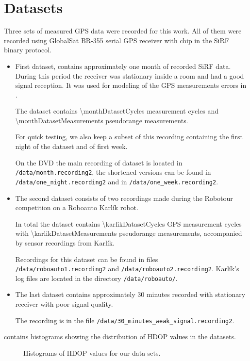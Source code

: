 \chapter{Datasets}
\label{chap:datasets}

Three sets of measured GPS data were recorded for this work.
All of them were recorded using GlobalSat BR-355 serial GPS receiver with \sirf chip
in the SiRF binary protocol.

\begin{itemize}

\item
First dataset,  contains approximately one month of recorded SiRF data.
During this period the receiver was stationary inside a room and had a good signal 
reception.
It was used for modeling of the GPS measurements errors in .

The dataset contains \num{\monthDatasetCycles} measurement cycles and
\num{\monthDatasetMeasurements} pseudorange measurements.

For quick testing, we also keep a subset of this recording containing the
first night of the dataset and of first week.

On the DVD the main recording of dataset is located in \verb=/data/month.recording2=,
the shortened versions can be found in \verb=/data/one_night.recording2= and in
\verb=/data/one_week.recording2=.

\item
The second dataset consists of two recordings made during
the Robotour competition \cite{robotour} on a Roboauto Karlík \cite{karlik} robot.

In total the dataset contains \num{\karlikDatasetCycles} GPS measurement cycles with
\num{\karlikDatasetMeasurements} pseudorange measurements, accompanied by sensor recordings from Karlík.

Recordings for this dataset can be found in files \verb=/data/roboauto1.recording2=
and \verb=/data/roboauto2.recording2=.
Karlík's log files are located in the directory \verb=/data/roboauto/=.

\item
The last dataset contains approximately
30 minutes recorded with stationary receiver with poor signal quality.

The recording is in the file \verb=/data/30_minutes_weak_signal.recording2=.

\end{itemize}

 contains histograms showing the distribution of HDOP values in the datasets.

\begin{figure}[htp]
	\centering
	\noindent{}
	\caption{Histograms of HDOP values for our data sets.}
	\label{fig:hdop-hist}
\end{figure}


